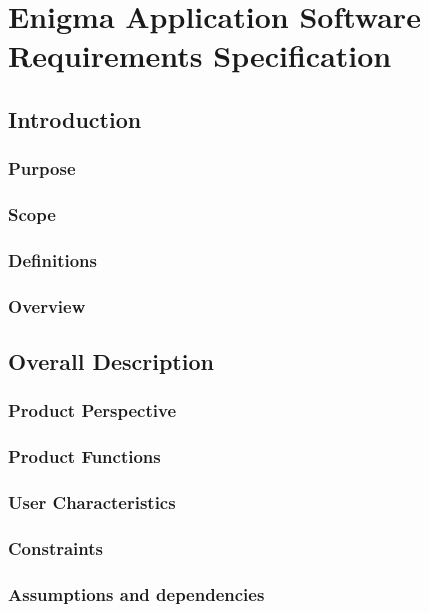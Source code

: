 
\chapter{Enigma Application Software Requirements Specification}
\label{AppendixA}

\section{Introduction}

\subsection{Purpose}

\subsection{Scope}

\subsection{Definitions}

\subsection{Overview}

\section{Overall Description}

\subsection{Product Perspective}

\subsection{Product Functions}

\subsection{User Characteristics}

\subsection{Constraints}

\subsection{Assumptions and dependencies}